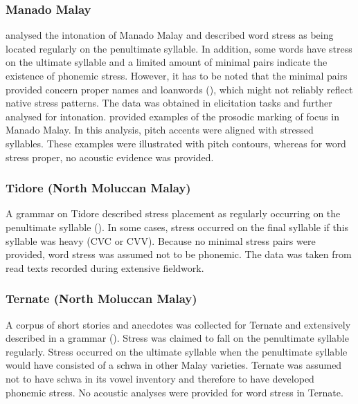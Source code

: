 \subsubsection{Manado Malay}
\citet{stoel_intonation_2007} analysed the intonation of Manado Malay and described word stress as being located regularly on the penultimate syllable. In addition, some words have stress on the ultimate syllable and a limited amount of minimal pairs indicate the existence of phonemic stress. However, it has to be noted that the minimal pairs provided concern proper names and loanwords (\citealt[118]{stoel_intonation_2007}), which might not reliably reflect native stress patterns. The data was obtained in elicitation tasks and further analysed for intonation. \citet{stoel_intonation_2007} provided examples of the prosodic marking of focus in Manado Malay. In this analysis, pitch accents were aligned with stressed syllables. These examples were illustrated with pitch contours, whereas for word stress proper, no acoustic evidence was provided.

\subsubsection{Tidore (North Moluccan Malay)}
A grammar on Tidore described stress placement as regularly occurring on the penultimate syllable (\citealt{vanstaden_tidore_2000}). In some cases, stress occurred on the final syllable if this syllable was heavy (CVC or CVV). Because no minimal stress pairs were provided, word stress was assumed not to be phonemic. The data was taken from read texts recorded during extensive fieldwork.

\subsubsection{Ternate (North Moluccan Malay)}
A corpus of short stories and anecdotes was collected for Ternate and extensively described in a grammar (\citealt{litamahuputty_ternate_2012}). Stress was claimed to fall on the penultimate syllable regularly. Stress occurred on the ultimate syllable when the penultimate syllable would have consisted of a schwa in other Malay varieties. Ternate was assumed not to have schwa in its vowel inventory and therefore to have developed phonemic stress. No acoustic analyses were provided for word stress in Ternate.

